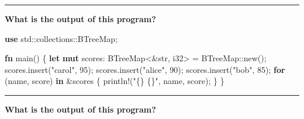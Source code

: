 \documentclass[
  11pt,
]{article}
\newenvironment{Shaded}{}{}
\newcommand{\ControlFlowTok}[1]{\textcolor[rgb]{0.00,0.44,0.13}{\textbf{#1}}}
\newcommand{\DataTypeTok}[1]{\textcolor[rgb]{0.56,0.13,0.00}{#1}}
\newcommand{\DecValTok}[1]{\textcolor[rgb]{0.25,0.63,0.44}{#1}}
\newcommand{\KeywordTok}[1]{\textcolor[rgb]{0.00,0.44,0.13}{\textbf{#1}}}
\newcommand{\NormalTok}[1]{#1}
\newcommand{\OperatorTok}[1]{\textcolor[rgb]{0.40,0.40,0.40}{#1}}
\newcommand{\PreprocessorTok}[1]{\textcolor[rgb]{0.74,0.48,0.00}{#1}}
\newcommand{\StringTok}[1]{\textcolor[rgb]{0.25,0.44,0.63}{#1}}
\begin{document}
\begin{center}\rule{0.5\linewidth}{0.5pt}\end{center}

\textbf{What is the output of this program?}

\begin{Shaded}
\begin{Highlighting}[]
\KeywordTok{use} \PreprocessorTok{std::collections::}\NormalTok{BTreeMap}\OperatorTok{;}

\KeywordTok{fn}\NormalTok{ main() }\OperatorTok{\{}
    \KeywordTok{let} \KeywordTok{mut}\NormalTok{ scores}\OperatorTok{:}\NormalTok{ BTreeMap}\OperatorTok{\textless{}\&}\DataTypeTok{str}\OperatorTok{,} \DataTypeTok{i32}\OperatorTok{\textgreater{}} \OperatorTok{=} \PreprocessorTok{BTreeMap::}\NormalTok{new()}\OperatorTok{;}
\NormalTok{    scores}\OperatorTok{.}\NormalTok{insert(}\StringTok{"carol"}\OperatorTok{,} \DecValTok{95}\NormalTok{)}\OperatorTok{;}
\NormalTok{    scores}\OperatorTok{.}\NormalTok{insert(}\StringTok{"alice"}\OperatorTok{,} \DecValTok{90}\NormalTok{)}\OperatorTok{;}
\NormalTok{    scores}\OperatorTok{.}\NormalTok{insert(}\StringTok{"bob"}\OperatorTok{,} \DecValTok{85}\NormalTok{)}\OperatorTok{;}
    \ControlFlowTok{for}\NormalTok{ (name}\OperatorTok{,}\NormalTok{ score) }\KeywordTok{in} \OperatorTok{\&}\NormalTok{scores }\OperatorTok{\{}
        \PreprocessorTok{println!}\NormalTok{(}\StringTok{"\{\} \{\}"}\OperatorTok{,}\NormalTok{ name}\OperatorTok{,}\NormalTok{ score)}\OperatorTok{;}
    \OperatorTok{\}}
\OperatorTok{\}}
\end{Highlighting}
\end{Shaded}

\begin{center}\rule{0.5\linewidth}{0.5pt}\end{center}

\textbf{What is the output of this program?}
\end{document}
